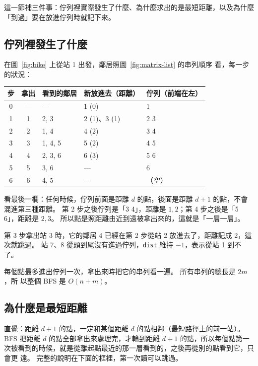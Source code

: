 這一節補三件事：佇列裡實際發生了什麼、為什麼求出的是最短距離，以及為什麼
「到過」要在放進佇列時就記下來。

\subsection{佇列裡發生了什麼}

在圖~\ref{fig:bike} 上從站 1 出發，鄰居照圖~\ref{fig:matrix-list} 的串列順序
看，每一步的狀況：

\begin{center}
\begin{tabular}{cclll}
\toprule
步 & 拿出 & 看到的鄰居 & 新放進去（距離）& 佇列（前端在左）\\
\midrule
0 & --- & --- & 1 (0) & 1 \\
1 & 1 & 2, 3 & 2 (1)、3 (1) & 2 3 \\
2 & 2 & 1, 4 & 4 (2) & 3 4 \\
3 & 3 & 1, 4, 5 & 5 (2) & 4 5 \\
4 & 4 & 2, 3, 6 & 6 (3) & 5 6 \\
5 & 5 & 3, 6 & --- & 6 \\
6 & 6 & 4, 5 & --- & （空）\\
\bottomrule
\end{tabular}
\end{center}

看最後一欄：任何時候，佇列前面是距離 $d$ 的點，後面是距離 $d + 1$ 的點，不會
混進第三種距離。 第 2 步之後佇列是「3 4」，距離是 $1, 2$；第 4 步之後是「5
6」，距離是 $2, 3$。 所以點是照距離由近到遠被拿出來的，這就是「一層一層」。

第 3 步拿出站 3 時，它的鄰居 4 已經在第 2 步從站 2 放進去了，距離記成 $2$，這
次就跳過。 站 7、8 從頭到尾沒有進過佇列，\texttt{dist} 維持 $-1$，表示從站 1
到不了。

每個點最多進出佇列一次，拿出來時把它的串列看一遍。 所有串列的總長是 $2m$，所
以整個 BFS 是 $O(n + m)$。

\subsection{為什麼是最短距離}

直覺：距離 $d + 1$ 的點，一定和某個距離 $d$ 的點相鄰（最短路徑上的前一站）。
BFS 把距離 $d$ 的點全部拿出來處理完，才輪到距離 $d + 1$ 的點，所以每個點第一
次被看到的時候，就是從離起點最近的那一層看到的，之後再從別的點看到它，只會更
遠。 完整的說明在下面的框裡，第一次讀可以跳過。

